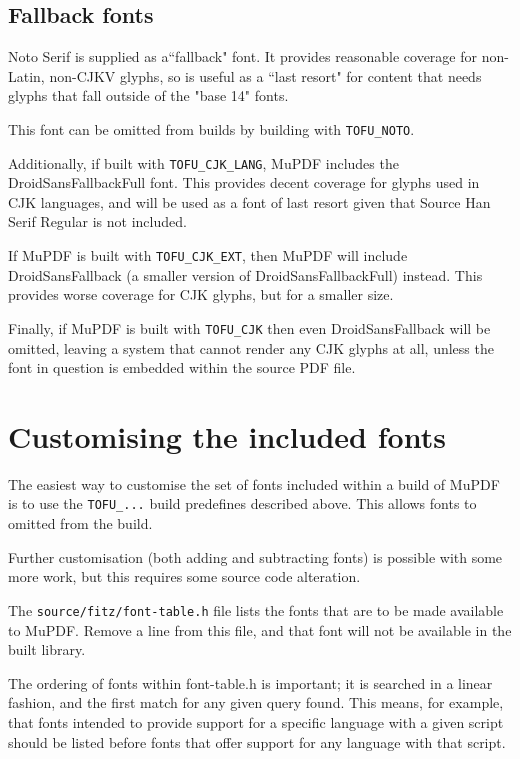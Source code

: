 \documentclass[oneside]{book}
\begin{document}
\subsection{Fallback fonts}

Noto Serif is supplied as a``fallback" font. It provides reasonable coverage for non-Latin, non-CJKV glyphs, so is useful as a ``last resort" for content that needs glyphs that fall outside of the "base 14" fonts.

This font can be omitted from builds by building with \texttt{TOFU\_NOTO}.

Additionally, if built with \texttt{TOFU\_CJK\_LANG}, MuPDF includes the DroidSansFallbackFull font. This provides decent coverage for glyphs used in CJK languages, and will be used as a font of last resort given that Source Han Serif Regular is not included.

If MuPDF is built with \texttt{TOFU\_CJK\_EXT}, then MuPDF will include DroidSansFallback (a smaller version of DroidSansFallbackFull) instead. This provides worse coverage for CJK glyphs, but for a smaller size.

Finally, if MuPDF is built with \texttt{TOFU\_CJK} then even DroidSansFallback will be omitted, leaving a system that cannot render any CJK glyphs at all, unless the font in question is embedded within the source PDF file.

\section{Customising the included fonts}

The easiest way to customise the set of fonts included within a build of MuPDF is to use the \texttt{TOFU\_...} build predefines described above. This allows fonts to omitted from the build.

Further customisation (both adding and subtracting fonts) is possible with some more work, but this requires some source code alteration.

The \texttt{source/fitz/font-table.h} file lists the fonts that are to be made available to MuPDF. Remove a line from this file, and that font will not be available in the built library.

The ordering of fonts within font-table.h is important; it is searched in a linear fashion, and the first match for any given query found. This means, for example, that fonts intended to provide support for a specific language with a given script should be listed before fonts that offer support for any language with that script.
\end{document}
